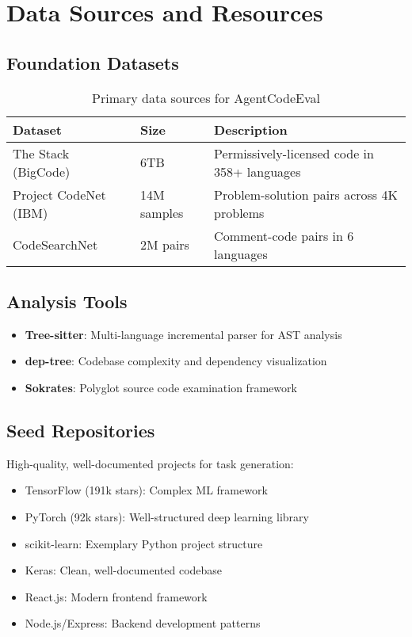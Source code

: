 \documentclass{article}
\begin{document}
\section{Data Sources and Resources}

\subsection{Foundation Datasets}
\begin{table}[h]
\centering
\begin{tabular}{@{}lll@{}}
\toprule
Dataset & Size & Description \\
\midrule
The Stack (BigCode) & 6TB & Permissively-licensed code in 358+ languages \\
Project CodeNet (IBM) & 14M samples & Problem-solution pairs across 4K problems \\
CodeSearchNet & 2M pairs & Comment-code pairs in 6 languages \\
\bottomrule
\end{tabular}
\caption{Primary data sources for AgentCodeEval}
\end{table}

\subsection{Analysis Tools}
\begin{itemize}
    \item \textbf{Tree-sitter}: Multi-language incremental parser for AST analysis
    \item \textbf{dep-tree}: Codebase complexity and dependency visualization
    \item \textbf{Sokrates}: Polyglot source code examination framework
\end{itemize}

\subsection{Seed Repositories}
High-quality, well-documented projects for task generation:
\begin{itemize}
    \item TensorFlow (191k stars): Complex ML framework
    \item PyTorch (92k stars): Well-structured deep learning library
    \item scikit-learn: Exemplary Python project structure
    \item Keras: Clean, well-documented codebase
    \item React.js: Modern frontend framework
    \item Node.js/Express: Backend development patterns
\end{itemize}
\end{document}
